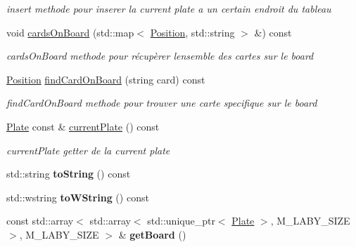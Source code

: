 \begin{DoxyCompactItemize}
\begin{DoxyCompactList}\small\item\em insert methode pour inserer la current plate a un certain endroit du tableau \end{DoxyCompactList}\item 
\mbox{\label{class_board_ab386de7f0d6276c61905c52a244808d1}} 
void \mbox{\hyperlink{class_board_ab386de7f0d6276c61905c52a244808d1}{cards\+On\+Board}} (std\+::map$<$ \mbox{\hyperlink{class_position}{Position}}, std\+::string $>$ \&) const
\begin{DoxyCompactList}\small\item\em cards\+On\+Board methode pour récupèrer l\textquotesingle{}ensemble des cartes sur le board \end{DoxyCompactList}\item 
\mbox{\hyperlink{class_position}{Position}} \mbox{\hyperlink{class_board_a9585278deb40615be54520d8de432c21}{find\+Card\+On\+Board}} (string card) const
\begin{DoxyCompactList}\small\item\em find\+Card\+On\+Board methode pour trouver une carte specifique sur le board \end{DoxyCompactList}\item 
\mbox{\hyperlink{class_plate}{Plate}} const  \& \mbox{\hyperlink{class_board_a63efb6f8c174f08251b2f5d4213d6358}{current\+Plate}} () const
\begin{DoxyCompactList}\small\item\em current\+Plate getter de la current plate \end{DoxyCompactList}\item 
\mbox{\label{class_board_ac1987782a97787c44fe6d923b7b32067}} 
std\+::string {\bfseries to\+String} () const
\item 
\mbox{\label{class_board_a2e6c71603374a95ecc3caddf187c4b75}} 
std\+::wstring {\bfseries to\+W\+String} () const
\item 
\mbox{\label{class_board_a7ffcf75affd056eb807b9551dea74f5f}} 
const std\+::array$<$ std\+::array$<$ std\+::unique\+\_\+ptr$<$ \mbox{\hyperlink{class_plate}{Plate}} $>$, M\+\_\+\+L\+A\+B\+Y\+\_\+\+S\+I\+ZE $>$, M\+\_\+\+L\+A\+B\+Y\+\_\+\+S\+I\+ZE $>$ \& {\bfseries get\+Board} ()
\item 
\mbox{\label{class_board_a6de0db1394cef93968fa0b25a22e1a04}} 

\end{DoxyCompactItemize}
